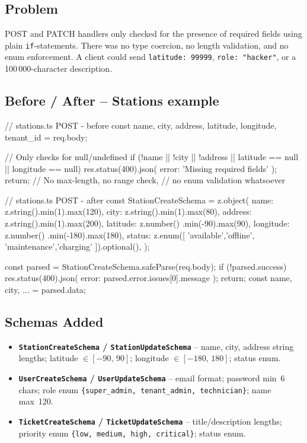 \documentclass[12pt,a4paper]{report}
\newcommand{\diffL}{\noindent\begin{minipage}[t]{0.485\linewidth}}
\newcommand{\diffR}{\end{minipage}\hfill\begin{minipage}[t]{0.485\linewidth}}
\newcommand{\diffend}{\end{minipage}\par\smallskip}
\newcommand{\file}[1]{\texttt{\small #1}}
\begin{document}
	\subsection*{Problem}
	
	POST and PATCH handlers only checked for the presence of required fields using
	plain \texttt{if}-statements. There was no type coercion, no length validation,
	and no enum enforcement. A client could send \texttt{latitude: 99999},
	\texttt{role: "hacker"}, or a 100\,000-character description.
	
	\subsection*{Before / After -- Stations example}
	
	\diffL
	\begin{beforecode}
		// stations.ts POST - before
		const {
			name, city, address,
			latitude, longitude, tenant_id
		} = req.body;
		
		// Only checks for null/undefined
		if (!name || !city || !address
		|| latitude == null
		|| longitude == null) {
			res.status(400).json({
				error: 'Missing required fields'
			});
			return;
		}
		// No max-length, no range check,
		// no enum validation whatsoever
	\end{beforecode}
	\diffR
	\begin{aftercode}
		// stations.ts POST - after
		const StationCreateSchema = z.object({
			name:    z.string().min(1).max(120),
			city:    z.string().min(1).max(80),
			address: z.string().min(1).max(200),
			latitude:  z.number()
			.min(-90).max(90),
			longitude: z.number()
			.min(-180).max(180),
			status: z.enum([
			'available','offline',
			'maintenance','charging'
			]).optional(),
		});
		
		const parsed =
		StationCreateSchema.safeParse(req.body);
		if (!parsed.success) {
			res.status(400).json({
				error: parsed.error.issues[0].message
			});
			return;
		}
		const { name, city, ... } = parsed.data;
	\end{aftercode}
	\diffend
	
	\subsection*{Schemas Added}
	
	\begin{itemize}
		\item \textbf{\file{StationCreateSchema} / \file{StationUpdateSchema}} -- name, city, address string lengths; latitude $\in [-90,\,90]$; longitude $\in [-180,\,180]$; status enum.
		\item \textbf{\file{UserCreateSchema} / \file{UserUpdateSchema}} -- email format; password min~6 chars; role enum \texttt{\{super\_admin, tenant\_admin, technician\}}; name max~120.
		\item \textbf{\file{TicketCreateSchema} / \file{TicketUpdateSchema}} -- title/description lengths; priority enum \texttt{\{low, medium, high, critical\}}; status enum.
	\end{itemize}
	
\end{document}
